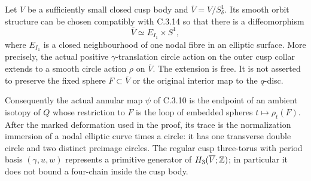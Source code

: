 \begin{proposition}
Let $V$ be a sufficiently small closed cusp body and
$\overline V=V/S^1_\delta$. Its smooth orbit structure can be
chosen compatibly with C.3.14 so that there is a diffeomorphism
\[
 \overline V\simeq E_{I_1}\times S^1,
\]
where $E_{I_1}$ is a closed neighbourhood of one nodal fibre in
an elliptic surface. More precisely, the actual positive
$\gamma$-translation circle action on the outer cusp collar
extends to a smooth circle action $\rho$ on $\overline V$.
The extension is free. It is not asserted to preserve the
fixed sphere $F\subset\overline V$ or the original interior
map to the $q$-disc.

Consequently the actual annular map $\psi$ of C.3.10 is the
endpoint of an ambient isotopy of $Q$ whose restriction to $F$
is the loop of embedded spheres $t\mapsto\rho_t(F)$.
After the marked deformation used in the proof, its trace is
the normalization immersion of a nodal elliptic curve times a
circle: it has one transverse double circle and two distinct
preimage circles. The regular cusp three-torus with period
basis $(\gamma,u,w)$ represents a primitive generator of
$H_3(\overline V;\mathbb Z)$; in particular it does not bound a
four-chain inside the cusp body.
\end{proposition}
